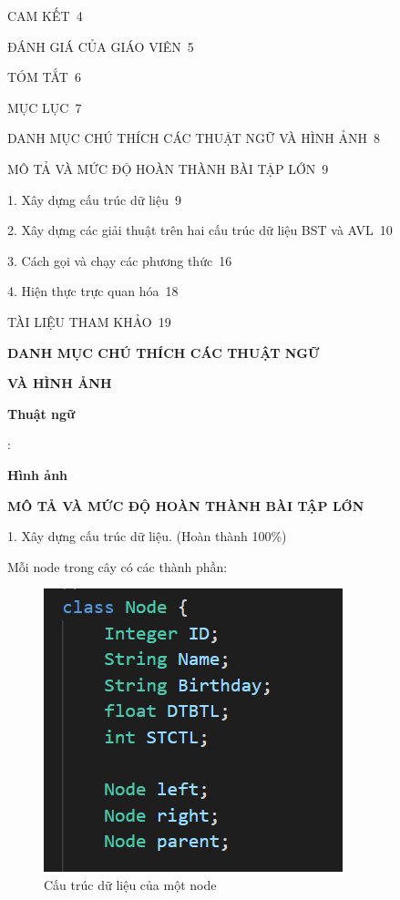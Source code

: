 \documentclass{report}
\begin{document}
\smallskip
CAM KẾT\dotfill\ 4

\smallskip
ĐÁNH GIÁ CỦA GIÁO VIÊN\dotfill\ 5

\smallskip
TÓM TẮT\dotfill\ 6

\smallskip
MỤC LỤC\dotfill\ 7

\smallskip
DANH MỤC CHÚ THÍCH CÁC THUẬT NGỮ VÀ HÌNH ẢNH\dotfill\ 8

\smallskip
MÔ TẢ VÀ MỨC ĐỘ HOÀN THÀNH BÀI TẬP LỚN\dotfill\ 9

\setlength{\parindent}{0.5cm}
1. Xây dựng cấu trúc dữ liệu\dotfill\ 9

2. Xây dựng các giải thuật trên hai cấu trúc dữ liệu BST và AVL\dotfill\ 10

3. Cách gọi và chạy các phương thức\dotfill\ 16

4. Hiện thực trực quan hóa\dotfill\ 18

\smallskip
\setlength{\parindent}{0cm}
TÀI LIỆU THAM KHẢO\dotfill\ 19

\newpage
\changefontsizes{16pt}
\centerline{\textbf{DANH MỤC CHÚ THÍCH CÁC THUẬT NGỮ}}
\centerline{\textbf{VÀ HÌNH ẢNH}}

\vspace{1cm}
\changefontsizes{14pt}
\textbf{Thuật ngữ}

\changefontsizes{13pt}
\bigskip
\textbf{} : 


\changefontsizes{14pt}
\bigskip
\textbf{Hình ảnh}

\bigskip
\changefontsizes{13pt}


\newpage
\changefontsizes{16pt}
\centerline{\textbf{MÔ TẢ VÀ MỨC ĐỘ HOÀN THÀNH BÀI TẬP LỚN}}

\bigskip
\changefontsizes{14pt}
1. Xây dựng cấu trúc dữ liệu. (Hoàn thành 100\%)

\smallskip
Mỗi node trong cây có các thành phần:

\begin{center}
    \begin{figure}[htp]
    \begin{center}
     \includegraphics[scale=1.3]{node.png}
    \end{center}
    \caption{Cấu trúc dữ liệu của một node}
    \label{refhinh1}
    \end{figure}
\end{center}
\end{document}
